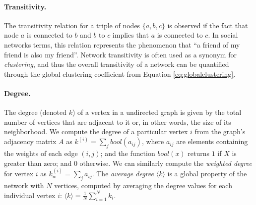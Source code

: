\paragraph*{Transitivity.}
The transitivity relation for a triple of nodes $\{a,b,c\}$ is observed if the fact that node $a$ is connected to $b$ and $b$ to $c$ implies that $a$ is connected to $c$.
In social networks terms, this relation represents the phenomenon that ``a friend of my friend is also my friend''.  
Network transitivity is often used as a synonym for \textit{clustering}, and thus the overall transitivity of a network can be quantified through the global clustering coefficient from Equation \ref{eq:globalclustering}.

\paragraph*{Degree.}
The degree (denoted $k$) of a vertex in a undirected graph is given by the total number of vertices that are adjacent to it or, in other words, the size of its neighborhood.
We compute the degree of a particular vertex $i$ from the graph's adjacency matrix $A$ as 
$
k^{(i)} = \sum_j bool(a_{i j})
$,
where $a_{i j}$ are elements containing the weights of each edge $(i,j)$; and the function $bool(x)$ returns $1$ if $X$ is greater than zero; and $0$ otherwise.
We can similarly compute the \textit{weighted degree} for vertex $i$ as $ k_{w}^{(i)} = \sum_j a_{i j} $.
The \textit{average degree} 
$\langle k \rangle$ 
is a global property of the network with $N$ vertices, computed by averaging the degree values for each individual vertex $i$:
$\langle k \rangle = \frac{1}{N} \sum_{i=1}^N k_i$.


